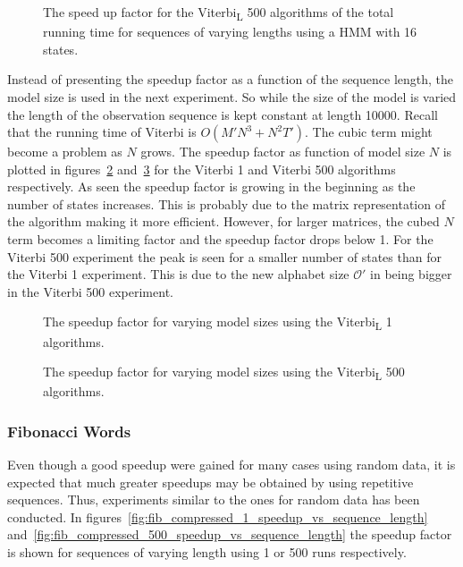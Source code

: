 \begin{figure}
  \centering
  
  \caption{The speed up factor for the Viterbi\textsubscript{L} 500 algorithms of the total
    running time for sequences of varying lengths using
    a HMM with 16 states.}
  \label{fig:compressed_500_speedup_vs_sequence_length}
\end{figure}

Instead of presenting the speedup factor as a function of the sequence length,
the model size is used in the next experiment. So while the size of the model
is varied the length of the observation sequence is kept constant at length
10000. Recall that the running time of Viterbi is $O(M' N^3 + N^2 T')$. The
cubic term might become a problem as $N$ grows. The speedup factor as function
of model size $N$ is plotted in figures~\ref{fig:speedup_vs_N}
and~\ref{fig:speedup_vs_N2} for the Viterbi 1 and Viterbi 500 algorithms
respectively. As seen the speedup factor is growing in the beginning as the
number of states increases. This is probably due to the matrix representation
of the algorithm making it more efficient. However, for larger matrices, the
cubed $N$ term becomes a limiting factor and the speedup factor drops below 1.
For the Viterbi 500 experiment the peak is seen for a smaller number of states
than for the Viterbi 1 experiment. This is due to the new alphabet size
$\mathcal{O'}$ in being bigger in the Viterbi 500 experiment.

\begin{figure}
  \centering
  
  \caption{The speedup factor for varying model sizes using the Viterbi\textsubscript{L} 1
    algorithms.}
  \label{fig:speedup_vs_N}
\end{figure}

\begin{figure}
  \centering
  
  \caption{The speedup factor for varying model sizes using the Viterbi\textsubscript{L} 500
    algorithms.}
  \label{fig:speedup_vs_N2}
\end{figure}

\subsubsection{Fibonacci Words}

Even though a good speedup were gained for many cases using random data, it is
expected that much greater speedups may be obtained by using repetitive
sequences. Thus, experiments similar to the ones for random data has been
conducted. In figures~\ref{fig:fib_compressed_1_speedup_vs_sequence_length}
and~\ref{fig:fib_compressed_500_speedup_vs_sequence_length} the speedup factor
is shown for sequences of varying length using 1 or 500 runs respectively.

